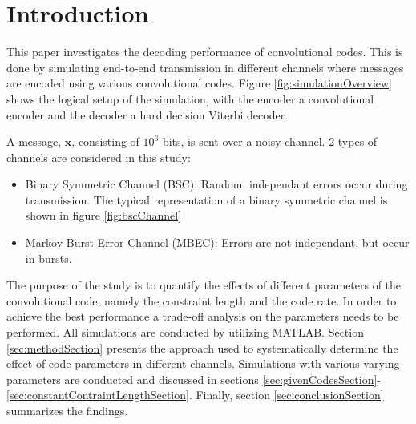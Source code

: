 \section{Introduction}
This paper investigates the decoding performance of convolutional codes. This is done by simulating end-to-end transmission in different channels where messages are encoded using various convolutional codes.
Figure \ref{fig:simulationOverview} shows the logical setup of the simulation, with the encoder a convolutional encoder and the decoder a hard decision Viterbi decoder.


A message, $\textbf{x}$, consisting of $10^6$ bits, is sent over a noisy channel. 2 types of channels are considered in this study:
\begin{itemize}\setlength\itemsep{0pt}
   \item Binary Symmetric Channel (BSC): Random, independant errors occur during transmission. The typical representation of a binary symmetric channel is shown in figure \ref{fig:bscChannel}
   \item Markov Burst Error Channel (MBEC): Errors are not independant, but occur in bursts.
\end{itemize}
The purpose of the study is to quantify the effects of different parameters of the convolutional code, namely the constraint length and the code rate. In order to achieve the best performance a trade-off analysis on the parameters needs to be performed. 
All simulations are conducted by utilizing MATLAB. Section \ref{sec:methodSection} presents the approach used to systematically determine the effect of code parameters in different channels. Simulations with various varying parameters are conducted and discussed in sections \ref{sec:givenCodesSection}-\ref{sec:constantContraintLengthSection}. Finally, section \ref{sec:conclusionSection} summarizes the findings.


